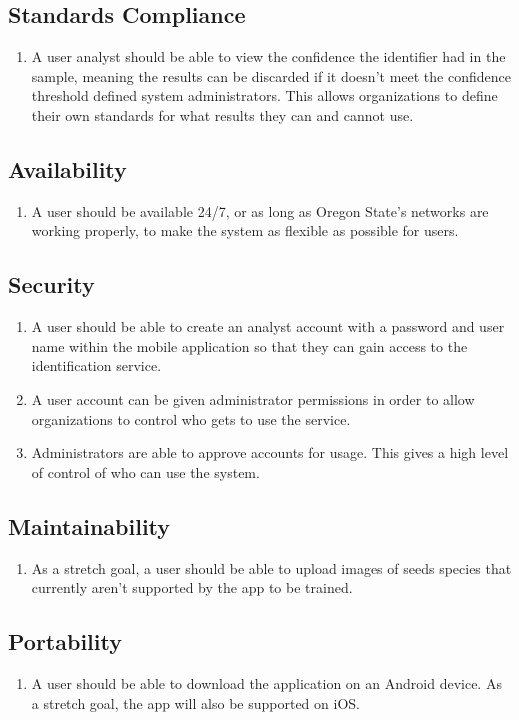 \documentclass[onecolumn, draftclsnofoot,10pt, compsoc]{IEEEtran}
\begin{document}
\subsection{Standards Compliance}
\begin{enumerate}
\item
A user analyst should be able to view the confidence the identifier had in the sample, meaning the results can be discarded if it doesn't meet the confidence threshold defined system administrators. This allows organizations to define their own standards for what results they can and cannot use.
\end{enumerate}
\subsection{Availability}
\begin{enumerate}
\item
A user should be available 24/7, or as long as Oregon State's networks are working properly, to make the system as flexible as possible for users.
\end{enumerate}
\subsection{Security}

\begin{enumerate}
\item
A user should be able to create an analyst account with a password and user name within the mobile application so that they can gain access to the identification service.
\item
A user account can be given administrator permissions in order to allow organizations to control who gets to use the service. 
\item
Administrators are able to approve accounts for usage. This gives a high level of control of who can use the system.
\end{enumerate}

\subsection{Maintainability}
\begin{enumerate}
\item
As a stretch goal, a user should be able to upload images of seeds species that currently aren't supported by the app to be trained.
\end{enumerate}
\subsection{Portability}
\begin{enumerate}
\item
A user should be able to download the application on an Android device. As a stretch goal, the app will also be supported on iOS.
\end{enumerate}
\end{document}
